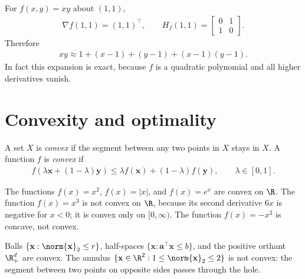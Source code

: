 \documentclass[a4paper, 12pt]{book}
\begin{document}
\begin{example}
    For $f(x,y)=xy$ about $(1,1)$,
    \begin{align}
        \nabla f(1,1) = (1,1)^\top,
        \qquad
        H_f(1,1) = \begin{bmatrix}0&1\\1&0\end{bmatrix}.
    \end{align}
    Therefore
    \begin{align}
        xy \approx 1 + (x-1) + (y-1) + (x-1)(y-1).
    \end{align}
    In fact this expansion is exact, because $f$ is a quadratic polynomial and all
    higher derivatives vanish.
\end{example}

\section{Convexity and optimality}

\begin{definition}
    A set $X$ is \emph{convex} if the segment between any two points in $X$ stays in $X$. A function $f$ is \emph{convex} if
\begin{align}
    f(\lambda \mathbf{x} + (1-\lambda)\mathbf{y})
    \leq \lambda f(\mathbf{x}) + (1-\lambda) f(\mathbf{y}),
    \qquad \lambda \in [0,1].
\end{align}
\end{definition}

\begin{example}
    The functions $f(x)=x^2$, $f(x)=|x|$, and $f(x)=e^x$ are convex on $\R$. The
    function $f(x)=x^3$ is not convex on $\R$, because its second derivative $6x$ is
    negative for $x<0$; it is convex only on $[0,\infty)$. The function $f(x)=-x^2$
    is concave, not convex.
\end{example}

\begin{example}
    Balls $\{\mathbf{x}:\norm{\mathbf{x}}_2\leq r\}$, half-spaces
    $\{\mathbf{x}:\mathbf{a}^\top\mathbf{x}\leq b\}$, and the positive orthant
    $\R^d_+$ are convex. The annulus
    $\{\mathbf{x}\in\R^2:1\leq\norm{\mathbf{x}}_2\leq2\}$ is not convex: the segment
    between two points on opposite sides passes through the hole.
\end{example}
\end{document}
